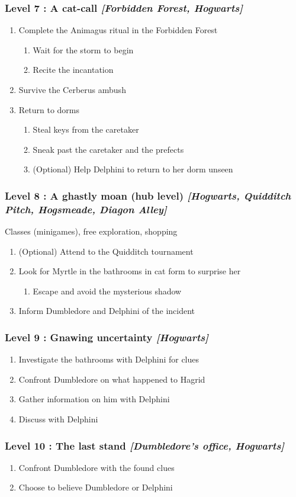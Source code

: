 \subsubsection{Level 7 : A cat-call \textit{[Forbidden Forest, Hogwarts]}}
\begin{enumerate}[1)]
	\item Complete the Animagus ritual in the Forbidden Forest
	\begin{enumerate}[1.]
		\item Wait for the storm to begin
		\item Recite the incantation
	\end{enumerate}
	\item Survive the Cerberus ambush
	\item Return to dorms
	\begin{enumerate}[1.]
		\item Steal keys from the caretaker
		\item Sneak past the caretaker and the prefects
		\item (Optional) Help Delphini to return to her dorm unseen
	\end{enumerate}
\end{enumerate}

\subsubsection{Level 8 : A ghastly moan (hub level) \textit{[Hogwarts, Quidditch Pitch, Hogsmeade, Diagon Alley]}}

Classes (minigames), free exploration, shopping

\begin{enumerate}[1)]
	\item (Optional) Attend to the Quidditch tournament
	\item Look for Myrtle in the bathrooms in cat form to surprise her
	\begin{enumerate}[1.]
		\item Escape and avoid the mysterious shadow
	\end{enumerate}
	\item Inform Dumbledore and Delphini of the incident
\end{enumerate}

\subsubsection{Level 9 : Gnawing uncertainty \textit{[Hogwarts]}}
\begin{enumerate}[1)]
	\item Investigate the bathrooms with Delphini for clues
	\item Confront Dumbledore on what happened to Hagrid
	\item Gather information on him with Delphini
	\item Discuss with Delphini
\end{enumerate}

\subsubsection{Level 10 : The last stand \textit{[Dumbledore's office, Hogwarts]}}
\begin{enumerate}[1)]
	\item Confront Dumbledore with the found clues
	\item Choose to believe Dumbledore or Delphini
\end{enumerate}

\pagebreak